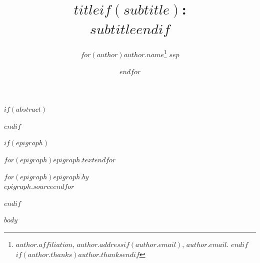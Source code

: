 \documentclass[12pt,letterpaper,twoside]{article}
\title{\Large\textbf{{$title$}$if(subtitle)$:\\ $subtitle$}$endif$}
\author{$for(author)$\normalsize{$author.name$}\thanks{$author.affiliation$, $author.address$$if(author.email)$, $author.email$. $endif$$if(author.thanks)$$author.thanks$$endif$} $sep$ \and $endfor$}
\date{}
\begin{document}

\maketitle


$if(abstract)$
\begin{abstract}
\footnotesize
{}
\end{abstract}
$endif$

$if(epigraph)$
\epigraph{{$for(epigraph)$\itshape{$epigraph.text$}$endfor$}}%
{$for(epigraph)${$epigraph.by$}\\ {$epigraph.source$}$endfor$}
$endif$

\singlespacing

$body$
\end{document}
